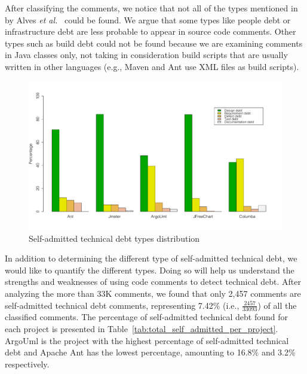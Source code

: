 After classifying the comments, we notice that not all of the types mentioned in by Alves \emph{et al.}~\cite{Alves2014MTD} could be found. We argue that some types like people debt or infrastructure debt are less probable to appear in source code comments. Other types such as build debt could not be found because we are examining comments in Java classes only, not taking in consideration build scripts that are usually written in other languages (e.g., Maven and Ant use XML files as build scripts). 



\begin{figure}[thb!]
  \centering
  \includegraphics[width=1\textwidth]{figures/technical_debt_distribution.pdf}
  \caption{Self-admitted technical debt types distribution}
  \label{fig:satd_distribution}
\end{figure}

In addition to determining the different type of self-admitted technical debt, we would like to quantify the different types. Doing so will help us understand the strengths and weaknesses of using code comments to detect technical debt. After analyzing the more than 33K comments, we found that only 2,457 comments are self-admitted technical debt comments, representing 7.42\% (i.e., $\frac{2457}{33093}$) of all the classified comments. The percentage of self-admitted technical debt found for each project is presented in Table~\ref{tab:total_self_admitted_per_project}. ArgoUml is the project with the highest percentage of self-admitted technical debt and Apache Ant has the lowest percentage, amounting to 16.8\% and 3.2\% respectively.

